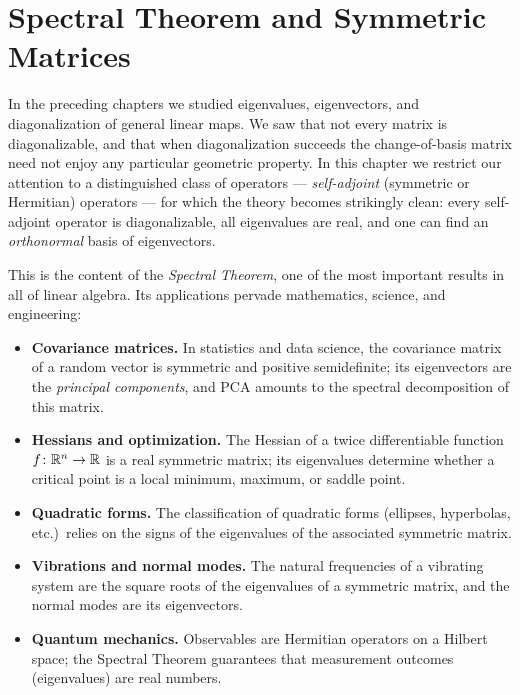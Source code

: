 
\chapter{Spectral Theorem and Symmetric Matrices}\label{ch:spectral}


In the preceding chapters we studied eigenvalues, eigenvectors, and
diagonalization of general linear maps.  We saw that not every matrix
is diagonalizable, and that when diagonalization succeeds the change-of-basis
matrix need not enjoy any particular geometric property.  In this chapter
we restrict our attention to a distinguished class of operators ---
\emph{self-adjoint} (symmetric or Hermitian)
operators --- for which the theory becomes strikingly clean: every
self-adjoint operator is diagonalizable, all eigenvalues are real, and
one can find an \emph{orthonormal} basis of eigenvectors.

This is the content of the \emph{Spectral Theorem},
one of the most important results in all of linear algebra.  Its applications
pervade mathematics, science, and engineering:
\begin{itemize}
  \item \textbf{Covariance matrices.}  In statistics and data science, the
    covariance matrix of a random vector is symmetric and positive
    semi\-definite; its eigenvectors are the \emph{principal components}, and
    PCA amounts to the spectral
    decomposition of this matrix.
  \item \textbf{Hessians and optimization.}  The Hessian of a twice
    differentiable function $f\colon{\mathbb{R}}^n\to{\mathbb{R}}$ is a real symmetric matrix;
    its eigenvalues determine whether a critical point is a local minimum,
    maximum, or saddle point.
  \item \textbf{Quadratic forms.}  The classification of quadratic forms
    (ellipses, hyperbolas, etc.)\ relies on the signs of the eigenvalues of
    the associated symmetric matrix.
  \item \textbf{Vibrations and normal modes.}  The natural frequencies of a
    vibrating system are the square roots of the eigenvalues of a symmetric
    matrix, and the normal modes are its eigenvectors.
  \item \textbf{Quantum mechanics.}  Observables are Hermitian operators on a
    Hilbert space; the Spectral Theorem guarantees that measurement outcomes
    (eigenvalues) are real numbers.
\end{itemize}

